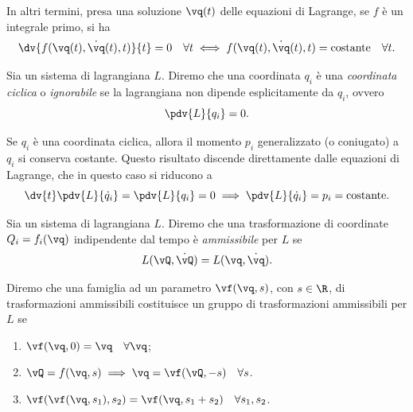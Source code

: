 In altri termini, presa una soluzione $\vq(t)$ delle equazioni di Lagrange, se $f$ è un integrale primo, si ha
\begin{equation*}
    \dv{f(\vq(t), \dot{\vq}(t), t)}{t} = 0 \quad \forall t \iff f(\vq(t), \dot{\vq}(t), t) = \text{costante} \quad \forall t.
\end{equation*}

\begin{definition}
    Sia un sistema di lagrangiana $L$. Diremo che una coordinata $q_i$ è una \emph{coordinata ciclica} o \emph{ignorabile} se la lagrangiana non dipende esplicitamente da $q_i$, ovvero
    \begin{equation*}
        \pdv{L}{q_i} = 0.
    \end{equation*}
\end{definition}

\begin{remark}
    Se $q_i$ è una coordinata ciclica, allora il momento $p_i$ generalizzato (o coniugato) a $q_i$ si conserva costante. Questo risultato discende direttamente dalle equazioni di Lagrange, che in questo caso si riducono a
    \begin{equation*}
        \dv{t}\pdv{L}{\dot{q}_i} = \pdv{L}{q_i} = 0 \implies \pdv{L}{\dot{q}_i} = p_i = \text{costante}.
    \end{equation*}
\end{remark}

\begin{definition}
    Sia un sistema di lagrangiana $L$. Diremo che una trasformazione di coordinate $Q_i = f_i(\vq)$ indipendente dal tempo è \emph{ammissibile} per $L$ se
    \begin{equation*}
        L(\vQ, \dot{\vQ}) = L(\vq, \dot{\vq}).
    \end{equation*}
\end{definition}

\begin{definition}
    Diremo che una famiglia ad un parametro $\vf(\vq, s)$, con $s \in \R$, di trasformazioni ammissibili costituisce un gruppo di trasformazioni ammissibili per $L$ se
    \begin{enumerate}[label=($\roman*$)]
        \item $\vf(\vq, 0) = \vq \quad \forall \vq$;
        \item $\vQ = f(\vq, s) \implies \vq = \vf(\vQ, -s) \quad \forall s$.
        \item $\vf(\vf(\vq, s_1), s_2) = \vf(\vq, s_1 + s_2) \quad \forall s_1, s_2$.
    \end{enumerate}
\end{definition}

